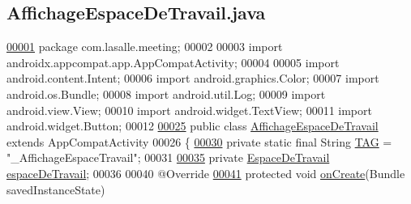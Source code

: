 \hypertarget{_affichage_espace_de_travail_8java_source}{}\subsection{Affichage\+Espace\+De\+Travail.\+java}
\label{_affichage_espace_de_travail_8java_source}

\begin{DoxyCode}
\hyperlink{namespacecom_1_1lasalle_1_1meeting}{00001} \textcolor{keyword}{package }com.lasalle.meeting;
00002 
00003 \textcolor{keyword}{import} androidx.appcompat.app.AppCompatActivity;
00004 
00005 \textcolor{keyword}{import} android.content.Intent;
00006 \textcolor{keyword}{import} android.graphics.Color;
00007 \textcolor{keyword}{import} android.os.Bundle;
00008 \textcolor{keyword}{import} android.util.Log;
00009 \textcolor{keyword}{import} android.view.View;
00010 \textcolor{keyword}{import} android.widget.TextView;
00011 \textcolor{keyword}{import} android.widget.Button;
00012 
\hyperlink{classcom_1_1lasalle_1_1meeting_1_1_affichage_espace_de_travail}{00025} \textcolor{keyword}{public} \textcolor{keyword}{class }\hyperlink{classcom_1_1lasalle_1_1meeting_1_1_affichage_espace_de_travail}{AffichageEspaceDeTravail} \textcolor{keyword}{extends} AppCompatActivity
00026 \{
\hyperlink{classcom_1_1lasalle_1_1meeting_1_1_affichage_espace_de_travail_a8606eb11c7b28f52226544de431d86a4}{00030}     \textcolor{keyword}{private} \textcolor{keyword}{static} \textcolor{keyword}{final} String \hyperlink{classcom_1_1lasalle_1_1meeting_1_1_affichage_espace_de_travail_a8606eb11c7b28f52226544de431d86a4}{TAG} = \textcolor{stringliteral}{"\_AffichageEspaceTravail"};
00031 
\hyperlink{classcom_1_1lasalle_1_1meeting_1_1_affichage_espace_de_travail_a934d41c1c41882b94b65a95cee5aca13}{00035}     \textcolor{keyword}{private} \hyperlink{classcom_1_1lasalle_1_1meeting_1_1_espace_de_travail}{EspaceDeTravail} \hyperlink{classcom_1_1lasalle_1_1meeting_1_1_affichage_espace_de_travail_a934d41c1c41882b94b65a95cee5aca13}{espaceDeTravail};
00036 
00040     @Override
\hyperlink{classcom_1_1lasalle_1_1meeting_1_1_affichage_espace_de_travail_a333ff077dde89888afc62366f6dccf06}{00041}     \textcolor{keyword}{protected} \textcolor{keywordtype}{void} \hyperlink{classcom_1_1lasalle_1_1meeting_1_1_affichage_espace_de_travail_a333ff077dde89888afc62366f6dccf06}{onCreate}(Bundle savedInstanceState)

\end{DoxyCode}
